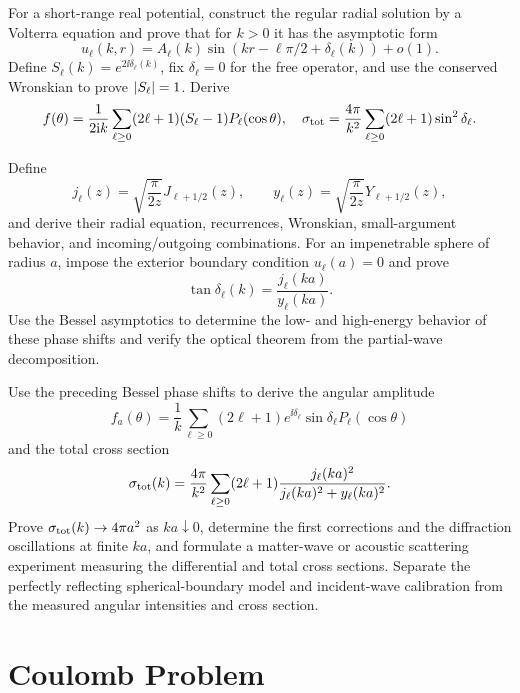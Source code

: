 \begin{exercise}
For a short-range real potential, construct the regular radial solution by a
Volterra equation and prove that for $k>0$ it has the asymptotic form
\[
 u_\ell(k,r)=A_\ell(k)
 \sin(kr-\ell\pi/2+\delta_\ell(k))+o(1).
\]
Define $S_\ell(k)=e^{2\ii\delta_\ell(k)}$, fix
$\delta_\ell=0$ for the free operator, and use the conserved Wronskian to
prove $\left\lvert S_\ell\right\rvert=1$.  Derive
\[
 f(\theta)=\frac1{2\mathrm i k}\sum_{\ell\ge0}(2\ell+1)
 (S_\ell-1)P_\ell(\cos\theta),
 \quad \sigma_{\rm tot}=\frac{4\pi}{k^2}
 \sum_{\ell\ge0}(2\ell+1)\sin^2\delta_\ell.
\]
\end{exercise}

\begin{exercise}
Define
\[
 j_\ell(z)=\sqrt{\frac{\pi}{2z}}J_{\ell+1/2}(z),
 \qquad
 y_\ell(z)=\sqrt{\frac{\pi}{2z}}Y_{\ell+1/2}(z),
\]
and derive their radial equation, recurrences, Wronskian, small-argument
behavior, and incoming/outgoing combinations.  For an impenetrable sphere of
radius $a$, impose the exterior boundary condition $u_\ell(a)=0$ and prove
\[
 \tan\delta_\ell(k)=\frac{j_\ell(ka)}{y_\ell(ka)}.
\]
Use the Bessel asymptotics to determine the low- and high-energy behavior of
these phase shifts and verify the optical theorem from the partial-wave
decomposition.
\end{exercise}

\begin{exercise}
Use the preceding Bessel phase shifts to derive the angular amplitude
\[
 f_a(\theta)=\frac1k\sum_{\ell\geq0}(2\ell+1)
 e^{\ii\delta_\ell}\sin\delta_\ell P_\ell(\cos\theta)
\]
and the total cross section
\[
 \sigma_{\rm tot}(k)=\frac{4\pi}{k^2}
 \sum_{\ell\geq0}(2\ell+1)
 \frac{j_\ell(ka)^2}{j_\ell(ka)^2+y_\ell(ka)^2}.
\]
Prove $\sigma_{\rm tot}(k)\to4\pi a^2$ as $ka\downarrow0$, determine the
first corrections and the diffraction oscillations at finite $ka$, and
formulate a matter-wave or acoustic scattering experiment measuring the
differential and total cross sections.  Separate the perfectly reflecting
spherical-boundary model and incident-wave calibration from the measured
angular intensities and cross section.
\end{exercise}

\section{Coulomb Problem}

